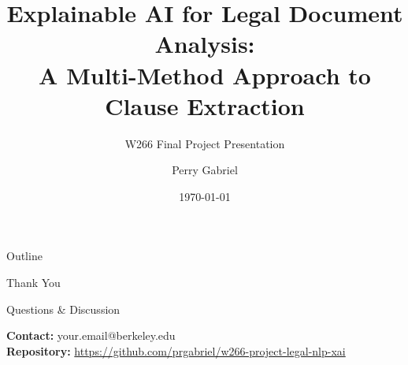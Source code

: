 \documentclass[aspectratio=169]{beamer}
\title[Legal NLP Explainability]{Explainable AI for Legal Document Analysis: \\
A Multi-Method Approach to Clause Extraction}
\subtitle{W266 Final Project Presentation}
\author[Gabriel]{Perry Gabriel}
\institute[UC Berkeley]{
  School of Information \\
  University of California, Berkeley
}
\date{\today}
\begin{document}
\frame{\titlepage}

\begin{frame}{Outline}
\tableofcontents
\end{frame}










\begin{frame}[plain]
\centering
\Huge \textcolor{berkeleyblue}{Thank You}
\vspace{1cm}

\Large Questions \& Discussion
\vspace{1cm}

\normalsize
\textbf{Contact:} your.email@berkeley.edu \\
\textbf{Repository:} \url{https://github.com/prgabriel/w266-project-legal-nlp-xai}
\end{frame}
\end{document}
